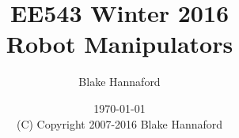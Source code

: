 \documentclass[oneside]{book}
\begin{document}
\setpagewiselinenumbers
\modulolinenumbers[5]

\setcounter{chapter}{0}



 \title{EE543  Winter 2016\\Robot Manipulators}

 \author{Blake Hannaford}

 \date{\today\\(C) Copyright 2007-2016 Blake Hannaford}

 \maketitle

\tableofcontents

\mainmatter

\linenumbers


%
%
% 
% 
%  
% 
% 
% 

\appendix



%
\label{LastPage}
\end{document}
